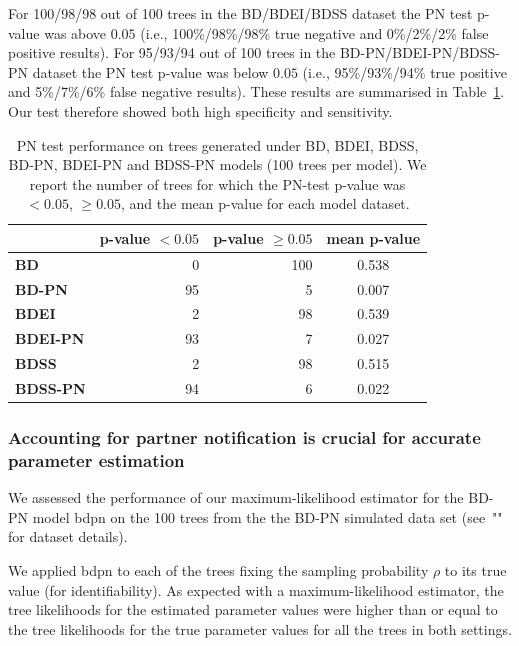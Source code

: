 \documentclass[10pt,letterpaper]{article}
\begin{document}
For 100/98/98 out of 100 trees in the BD/BDEI/BDSS dataset the PN test p-value was above $0.05$ (i.e., 100\%/98\%/98\% true negative and 0\%/2\%/2\% false positive results). For 95/93/94 out of 100 trees in the BD-PN/BDEI-PN/BDSS-PN dataset the PN test p-value was below $0.05$ (i.e., 95\%/93\%/94\% true positive and 5\%/7\%/6\% false negative results). These results are summarised in Table~\ref{tbl:pntest}. Our test therefore showed both high specificity and sensitivity.

\begin{table}[!h]\centering
\small
\caption{PN test performance on trees generated under BD, BDEI, BDSS, BD-PN, BDEI-PN and BDSS-PN models (100 trees per model). We report the number of trees for which the PN-test p-value was $<0.05$, $\geq 0.05$, and the mean p-value for each model dataset.}
\begin{tabular}{l|r|r|c}
 & \textbf{p-value $<0.05$} & \textbf{p-value $\geq0.05$} & \textbf{mean p-value} \\
  \midrule
\textbf{BD}& 0 & 100 & 0.538 \\
\textbf{BD-PN}& 95 & 5 & 0.007 \\
  \midrule
\textbf{BDEI}& 2 & 98 & 0.539 \\
\textbf{BDEI-PN}& 93 & 7 & 0.027 \\
  \midrule
\textbf{BDSS}& 2 & 98 & 0.515 \\
\textbf{BDSS-PN}& 94 & 6 & 0.022 \\
\end{tabular}
\label{tbl:pntest}
\end{table}

\subsubsection*{Accounting for partner notification is crucial for accurate parameter estimation}

We assessed the performance of our maximum-likelihood estimator for the BD-PN model bdpn on the 100 trees from the the BD-PN simulated data set (see~"" for dataset details).

We applied bdpn to each of the trees fixing the sampling probability $\rho$ to its true value (for identifiability). %
As expected with a maximum-likelihood estimator, the tree likelihoods for the estimated parameter values were higher than or equal to the tree likelihoods for the true parameter values for all the trees in both settings.
\end{document}
